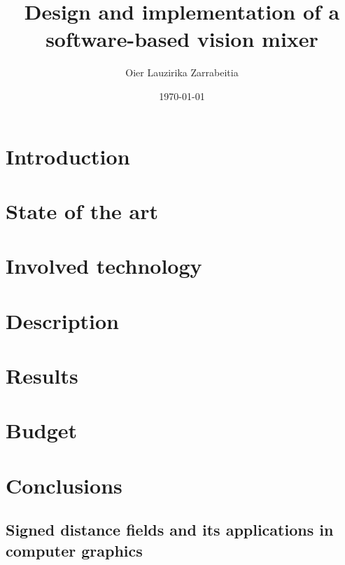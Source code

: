 \documentclass{etsist_pfg}
\title{Design and implementation of a software-based vision mixer}
\author{Oier Lauzirika Zarrabeitia}
\date{\today}
\begin{document}
\maketitle

\renewcommand{\abstractname}{Resumen}
\begin{abstract}
    
\end{abstract}

\renewcommand{\abstractname}{Abstract}
\begin{abstract}
    
\end{abstract}

\tableofcontents

\listoffigures

\listoftables



\chapter{Introduction}


\chapter{State of the art}


\chapter{Involved technology}


\chapter{Description}


\chapter{Results}


\chapter{Budget}


\chapter{Conclusions}


\printbibliography

\begin{appendices}
\chapter{Signed distance fields and its applications in computer graphics}


\end{appendices}
\end{document}
